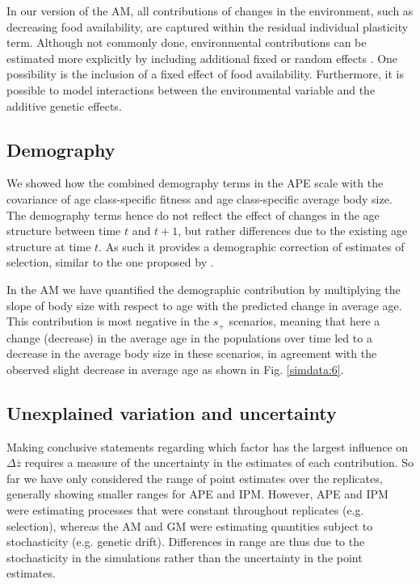 In our version of the AM, all contributions of changes in the environment, such as decreasing food availability, are captured within the residual individual plasticity term. Although not commonly done, environmental contributions can be estimated more explicitly by including additional fixed or random effects \parencite{Charmantier2014}. One possibility is the inclusion of a fixed effect of food availability. Furthermore, it is possible to model interactions between the environmental variable and the additive genetic effects. 

\subsection*{Demography}
We showed how the combined demography terms in the APE scale with the covariance of age class-specific fitness and age class-specific average body size. The demography terms hence do not reflect the effect of changes in the age structure between time $t$ and $t+1$, but rather differences due to the existing age structure at time $t$. As such it provides a demographic correction of estimates of selection, similar to the one proposed by \cite{engen2014b}.

In the AM we have quantified the demographic contribution by multiplying the slope of body size with respect to age with the predicted change in average age. This contribution is most negative in the $s_+$ scenarios, meaning that here a change (decrease) in the average age in the populations over time led to a decrease in the average body size in these scenarios, in agreement with the observed slight decrease in average age as shown in Fig. \ref{simdata:6}.

\subsection*{Unexplained variation and uncertainty}
Making conclusive statements regarding which factor has the largest influence on $\Delta \overline z$ requires a measure of the uncertainty in the estimates of each contribution. So far we have only considered the range of point estimates over the replicates, generally showing smaller ranges for APE and IPM. However, APE and IPM were estimating processes that were constant throughout replicates (e.g. selection), whereas the AM and GM were estimating quantities subject to stochasticity (e.g. genetic drift). Differences in range are thus due to the stochasticity in the simulations rather than the uncertainty in the point estimates.


